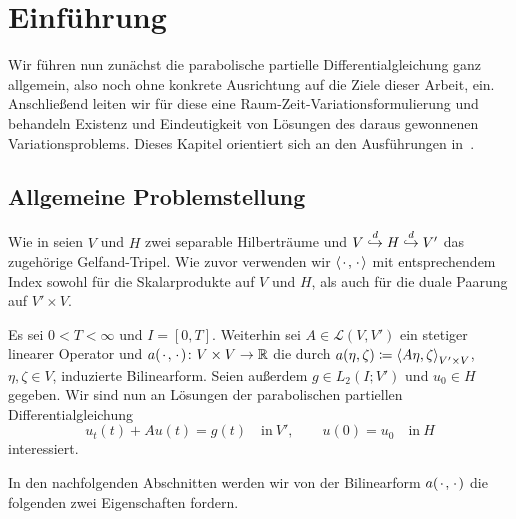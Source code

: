 
\chapter{Einführung} %
\label{cha:einfuehrung}

Wir führen nun zunächst die parabolische partielle Differentialgleichung ganz allgemein, also noch ohne konkrete Ausrichtung auf die Ziele dieser Arbeit, ein.
Anschließend leiten wir für diese eine Raum-Zeit-Variationsformulierung und behandeln Existenz und Eindeutigkeit von Lösungen des daraus gewonnenen Variationsproblems.
Dieses Kapitel orientiert sich an den Ausführungen in~\cite{Schwab:2009ec, Urban:2014kg}.

\section{Allgemeine Problemstellung} %
\label{sec:allgemeine_problemstellung}

Wie in  seien $V$ und $H$ zwei separable Hilberträume und $V \stackrel{d}{\hookrightarrow} H \stackrel{d}{\hookrightarrow} V'$ das zugehörige Gelfand-Tripel.
Wie zuvor verwenden wir $\left\langle{\mkern2mu\cdot\mkern2mu},{\mkern2mu\cdot\mkern2mu}\right\rangle$ mit entsprechendem Index sowohl für die Skalarprodukte auf $V$ und $H$, als auch für die duale Paarung auf $V' \times V$.

Es sei $0 < T < \infty$ und $I = [0, T]$.
Weiterhin sei $A \in \mathcal L(V, V')$ ein stetiger linearer Operator und $a({\mkern2mu\cdot\mkern2mu}, {\mkern2mu\cdot\mkern2mu}) \colon V \times V \to \mathbb{R}$ die durch $a(\eta, \zeta) \coloneqq \left\langle A \eta,\zeta\right\rangle_{V' \times V}$, $\eta, \zeta \in V$, induzierte Bilinearform.
Seien außerdem $g \in L_{2}(I; V')$ und $u_{0} \in H$ gegeben.
Wir sind nun an Lösungen der parabolischen partiellen Differentialgleichung
\begin{equation}
    \label{eq:allgemeine_parabolische_pde}
    u_{t}(t) + A u(t) = g(t) \quad \text{in}~V',
    \qquad
    u(0) = u_{0} \quad \text{in}~H
\end{equation}
interessiert.

In den nachfolgenden Abschnitten werden wir von der Bilinearform $a({\mkern2mu\cdot\mkern2mu}, {\mkern2mu\cdot\mkern2mu})$ die folgenden zwei Eigenschaften fordern.

